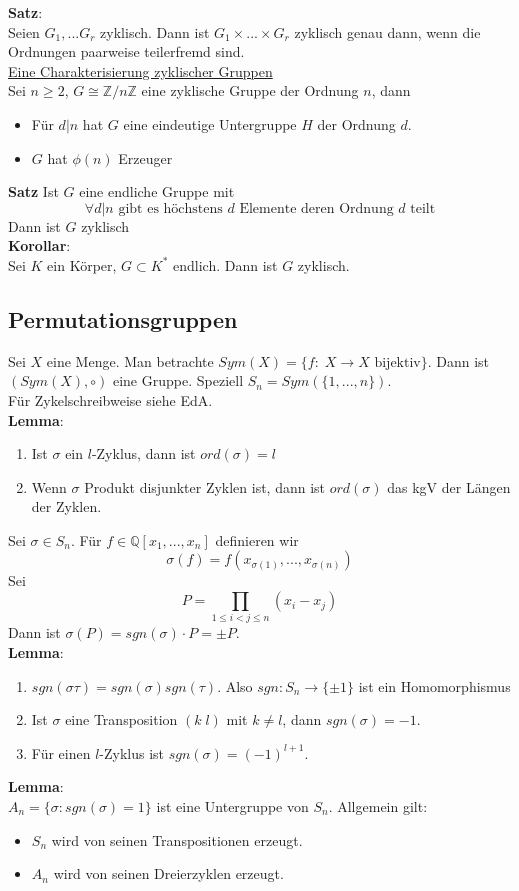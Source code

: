 \documentclass[a4paper, 12pt]{article}
\begin{document}
\textbf{Satz}:\\
Seien $G_1, ... G_r$ zyklisch. Dann ist $G_1 \times ... \times G_r$ zyklisch genau dann, wenn die Ordnungen paarweise teilerfremd sind.\\
\underline{Eine Charakterisierung zyklischer Gruppen}\\
Sei $n\geq 2$, $G\cong \mathbb{Z}/n\mathbb{Z}$ eine zyklische Gruppe der Ordnung $n$, dann \begin{itemize}
	\item Für $d|n$ hat $G$ eine eindeutige Untergruppe $H$ der Ordnung $d$. 
	\item $G$ hat $\phi(n)$ Erzeuger 
\end{itemize}
\textbf{Satz}
Ist $G$ eine endliche Gruppe mit \[\forall d|n \text{ gibt es höchstens $d$ Elemente deren Ordnung $d$ teilt}\]
Dann ist $G$ zyklisch\\
\textbf{Korollar}:\\
Sei $K$ ein Körper, $G\subset K^*$ endlich. Dann ist $G$ zyklisch. 
\subsection{Permutationsgruppen}
Sei $X$ eine Menge. Man betrachte $Sym(X) = \{f: \; X\to X \text{ bijektiv}\}$. Dann ist $(Sym(X), \circ)$ eine Gruppe. Speziell $S_n = Sym(\{1,...,n\})$.\\
Für Zykelschreibweise siehe EdA.\\
\textbf{Lemma}:
\begin{enumerate}
	\item Ist $\sigma$ ein $l$-Zyklus, dann ist $ord(\sigma) = l$
	\item Wenn $\sigma$ Produkt disjunkter Zyklen ist, dann ist $ord(\sigma)$ das kgV der Längen der Zyklen.
\end{enumerate}
Sei $\sigma \in S_n$. Für $f \in \mathbb{Q}[x_1,...,x_n]$ definieren wir \[\sigma(f) = f(x_{\sigma(1)},...,x_{\sigma(n)})\]
Sei \[P = \prod_{1\leq i < j \leq n}(x_i-x_j)\] Dann ist $\sigma(P) = sgn(\sigma)\cdot P = \pm P$.\\
\textbf{Lemma}:
\begin{enumerate}
	\item $sgn(\sigma \tau) = sgn(\sigma) sgn(\tau)$. Also $sgn: S_n \to \{\pm1\}$ ist ein Homomorphismus
	\item Ist $\sigma$ eine Transposition $(k\;l)$ mit $k\neq l$, dann $sgn(\sigma) = -1$.
	\item Für einen $l$-Zyklus ist $sgn(\sigma) = (-1)^{l+1}$.
\end{enumerate}
\textbf{Lemma}:\\
$A_n = \{\sigma: sgn(\sigma) = 1\}$ ist eine Untergruppe von $S_n$.
Allgemein gilt: \begin{itemize}
	\item $S_n$ wird von seinen Transpositionen erzeugt.
	\item $A_n$ wird von seinen Dreierzyklen erzeugt.
\end{itemize}
\end{document}
